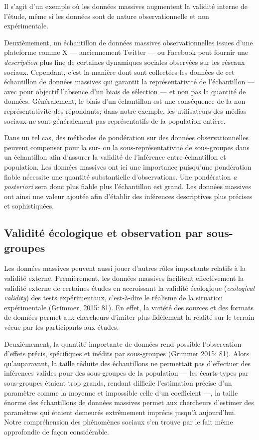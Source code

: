 \documentclass[
  letterpaper,
  DIV=11,
  numbers=noendperiod]{scrreprt}
\begin{document}
Il s'agit d'un exemple où les données massives augmentent la validité
interne de l'étude, même si les données sont de nature observationnelle
et non expérimentale.

Deuxièmement, un échantillon de données massives observationnelles
issues d'une plateforme comme X --- anciennement Twitter --- ou Facebook
peut fournir une \emph{description} plus fine de certaines dynamiques
sociales observées sur les réseaux sociaux. Cependant, c'est la manière
dont sont collectées les données de cet échantillon de données massives
qui garantit la représentativité de l'échantillon --- avec pour objectif
l'absence d'un biais de sélection --- et non pas la quantité de données.
Généralement, le biais d'un échantillon est une conséquence de la
non-représentativité des répondants; dans notre exemple, les
utilisateurs des médias sociaux ne sont généralement pas représentatifs
de la population entière.

Dans un tel cas, des méthodes de pondération sur des données
observationnelles peuvent compenser pour la sur- ou la
sous-représentativité de sous-groupes dans un échantillon afin d'assurer
la validité de l'inférence entre échantillon et population. Les données
massives ont ici une importance puisqu'une pondération fiable nécessite
une quantité substantielle d'observations. Une pondération \emph{a
posteriori} sera donc plus fiable plus l'échantillon est grand. Les
données massives ont ainsi une valeur ajoutée afin d'établir des
inférences descriptives plus précises et sophistiquées.

\subsection*{Validité écologique et observation par
sous-groupes}\label{validituxe9-uxe9cologique-et-observation-par-sous-groupes}

Les données massives peuvent aussi jouer d'autres rôles importants
relatifs à la validité externe. Premièrement, les données massives
facilitent effectivement la validité externe de certaines études en
accroissant la validité écologique (\emph{ecological validity}) des
tests expérimentaux, c'est-à-dire le réalisme de la situation
expérimentale (Grimmer, 2015: 81). En effet, la variété des sources et
des formats de données permet aux chercheurs d'imiter plus fidèlement la
réalité sur le terrain vécue par les participants aux études.

Deuxièmement, la quantité importante de données rend possible
l'observation d'effets précis, spécifiques et inédits par sous-groupes
(Grimmer 2015: 81). Alors qu'auparavant, la taille réduite des
échantillons ne permettait pas d'effectuer des inférences valides pour
des sous-groupes de la population --- les écarts-types par sous-groupes
étaient trop grands, rendant difficile l'estimation précise d'un
paramètre comme la moyenne et impossible celle d'un coefficient ---, la
taille énorme des échantillons de données massives permet aux chercheurs
d'estimer des paramètres qui étaient demeurés extrêmement imprécis
jusqu'à aujourd'hui. Notre compréhension des phénomènes sociaux s'en
trouve par le fait même approfondie de façon considérable.
\end{document}
